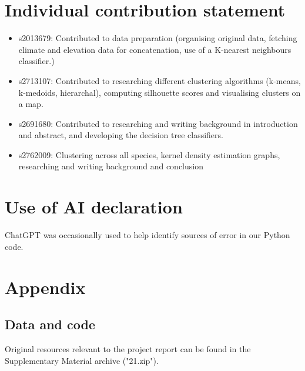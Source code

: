 \documentclass{article}
\begin{document}
\section*{Individual contribution statement}
\begin{itemize}
    \item s2013679: Contributed to data preparation (organising original data, fetching climate and elevation data for concatenation, use of a K-nearest neighbours classifier.)
    \item s2713107: Contributed to researching different clustering algorithms (k-means, k-medoids, hierarchal), computing silhouette scores and visualising clusters on a map.
    \item s2691680: Contributed to researching and writing background in introduction and abstract, and developing the decision tree classifiers.
    \item s2762009: Clustering across all species, kernel density estimation graphs, researching and writing background and conclusion
\end{itemize}    
\section*{Use of AI declaration}
ChatGPT was occasionally used to help identify sources of error in our Python code.

\newpage



\newpage
\section*{Appendix} \label{appendix}
\renewcommand{\thefigure}{A\arabic{figure}}
\setcounter{figure}{0}

\subsection*{Data and code}
Original resources relevant to the project report can be found in the Supplementary Material archive ("21.zip").
\end{document}
